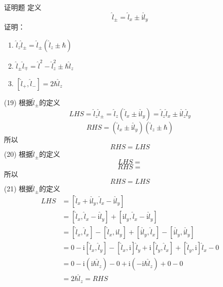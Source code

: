 \begin{question}{证明题}
    定义
    $$
        \hat{l}_{\pm} = \hat{l}_x \pm \mathrm{i}\hat{l}_y
    $$
    证明：
    \begin{enumerate}
        \item[(19)] $\hat{l}_z\hat{l}_{\pm}=\hat{l}_{\pm}\left(\hat{l}_z \pm \hbar\right)$
        \item[(20)] $\hat{l}_{\pm}\hat{l}_{\mp}=\hat{l}^2 - \hat{l}_z^2 \pm \hbar\hat{l}_z$
        \item[(21)] $\left[\hat{l}_{+}, \hat{l}_{-}\right]=2\hbar\hat{l}_z$
    \end{enumerate}
\end{question}
\begin{solution}
    (19) 根据$\hat{l}_{\pm}$的定义
    $$
        LHS = \hat{l}_z\hat{l}_{\pm}
        = \hat{l}_z\left(\hat{l}_x \pm \mathrm{i}\hat{l}_y\right)
        = \hat{l}_z\hat{l}_x \pm \mathrm{i}\hat{l}_z\hat{l}_y
    $$
    $$
        RHS = \left(\hat{l}_x \pm \mathrm{i}\hat{l}_y\right)\left(\hat{l}_z \pm \hbar\right)
    $$
    所以
    $$
        RHS=LHS
    $$
    (20) 根据$\hat{l}_{\pm}$的定义
    $$
        LHS =
    $$
    $$
        RHS =
    $$
    所以
    $$
        RHS=LHS
    $$
    (21) 根据$\hat{l}_{\pm}$的定义
    $$
        \begin{aligned}
            LHS & = [\hat{l}_x+\mathrm{i}\hat{l}_y,\hat{l}_x-\mathrm{i}\hat{l}_y]                                                                       \\
                & = [\hat{l}_x,\hat{l}_x-\mathrm{i}\hat{l}_y]+[\mathrm{i}\hat{l}_y,\hat{l}_x-\mathrm{i}\hat{l}_y]                                       \\
                & = [\hat{l}_x,\hat{l}_x]-[\hat{l}_x,\mathrm{i}\hat{l}_y]+[\mathrm{i}\hat{l}_y,\hat{l}_x]-[\mathrm{i}\hat{l}_y,\mathrm{i}\hat{l}_y]     \\
                & = 0-\mathrm{i}[\hat{l}_x,\hat{l}_y]-[\hat{l}_x,\mathrm{i}]\hat{l}_y+\mathrm{i}[\hat{l}_y,\hat{l}_x]+[\hat{l}_y,\mathrm{i}]\hat{l}_x-0 \\
                & = 0-\mathrm{i}(\mathrm{i}\hbar\hat{l}_z)-0+\mathrm{i}(-\mathrm{i}\hbar\hat{l}_z)+0-0                                                  \\
                & = 2\hbar\hat{l}_z = RHS                                                                                                               \\
        \end{aligned}
    $$
\end{solution}

